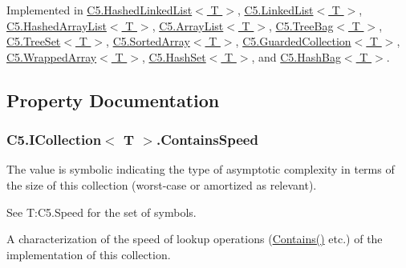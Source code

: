 Implemented in \hyperlink{class_c5_1_1_hashed_linked_list_a53e4be293af672a2354b7eb480ce48e6}{C5.\+Hashed\+Linked\+List$<$ T $>$}, \hyperlink{class_c5_1_1_linked_list_a248122a0d20dfd89e8e7e9a84062405d}{C5.\+Linked\+List$<$ T $>$}, \hyperlink{class_c5_1_1_hashed_array_list_ac0be87fa58015a3191d91ab0e8c75766}{C5.\+Hashed\+Array\+List$<$ T $>$}, \hyperlink{class_c5_1_1_array_list_a5bb957a4a9d9d8fa6040c0fe1c9d1237}{C5.\+Array\+List$<$ T $>$}, \hyperlink{class_c5_1_1_tree_bag_ae83ee2558781cc754bc6b601d23eb334}{C5.\+Tree\+Bag$<$ T $>$}, \hyperlink{class_c5_1_1_tree_set_a2769676af15081ee410f3a30aedb1c06}{C5.\+Tree\+Set$<$ T $>$}, \hyperlink{class_c5_1_1_sorted_array_afdd7b8a6e4fe02a1d91e5085d48ce7f8}{C5.\+Sorted\+Array$<$ T $>$}, \hyperlink{class_c5_1_1_guarded_collection_a0ff18d72c676480a225f9d3e3dacfcd0}{C5.\+Guarded\+Collection$<$ T $>$}, \hyperlink{class_c5_1_1_wrapped_array_aadf783ba87fbad13d1730cd2c922ab7a}{C5.\+Wrapped\+Array$<$ T $>$}, \hyperlink{class_c5_1_1_hash_set_a2a07fae0af3a3f329d47719019fb2c5b}{C5.\+Hash\+Set$<$ T $>$}, and \hyperlink{class_c5_1_1_hash_bag_a22061ab9c804125e28d56a4d32aa6ee7}{C5.\+Hash\+Bag$<$ T $>$}.



\subsection{Property Documentation}
\hypertarget{interface_c5_1_1_i_collection_a0a9bcd98894c191206e18c7c20c3bdfe}{}
\subsubsection[{Contains\+Speed}]{ {\bf C5.\+I\+Collection}$<$ T $>$.Contains\+Speed\hspace{0.3cm}{\ttfamily [get]}}\label{interface_c5_1_1_i_collection_a0a9bcd98894c191206e18c7c20c3bdfe}


The value is symbolic indicating the type of asymptotic complexity in terms of the size of this collection (worst-\/case or amortized as relevant). 

See T\+:\+C5.\+Speed for the set of symbols.

A characterization of the speed of lookup operations ({\ttfamily \hyperlink{interface_c5_1_1_i_collection_a4de01b6d77ea5eaffccc8267b4454cdd}{Contains()}} etc.) of the implementation of this collection.\hypertarget{interface_c5_1_1_i_collection_abddff5406ccd4e98d8d96f41bf9d6d5b}{}
